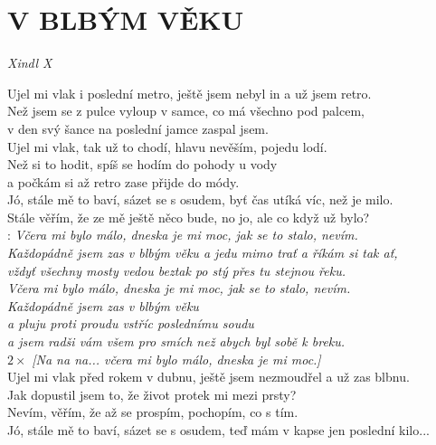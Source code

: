 \section*{\Huge V BLBÝM VĚKU}
\emph{Xindl X}\\

\begin{Large}

Ujel mi vlak i poslední metro, ještě jsem nebyl in a už jsem retro.\\
Než jsem se z pulce vyloup v samce, co má všechno pod palcem,\\
v den svý šance na poslední jamce zaspal jsem.\\

Ujel mi vlak, tak už to chodí, hlavu nevěším, pojedu lodí.\\
Než si to hodit, spíš se hodím do pohody u vody\\
a počkám si až retro zase přijde do módy.\\

Jó, stále mě to baví, sázet se s osudem, byť čas utíká víc, než je milo.\\
Stále věřím, že ze mě ještě něco bude, no jo, ale co když už bylo?\\

\textregistered: \emph{Včera mi bylo málo, dneska je mi moc,
jak se to stalo, nevím.\\
Každopádně jsem zas v blbým věku a jedu mimo trať a říkám si tak ať,\\
vždyť všechny mosty vedou beztak po stý přes tu stejnou řeku.}\\

\emph{Včera mi bylo málo, dneska je mi moc, jak se to stalo, nevím.\\
Každopádně jsem zas v blbým věku\\
a pluju proti proudu vstříc poslednímu soudu\\
a jsem radši vám všem pro smích než abych byl sobě k breku.}\\

$2\times$ \emph{[Na na na... včera mi bylo málo, dneska je mi moc.]}\\

Ujel mi vlak před rokem v dubnu, ještě jsem nezmoudřel a už zas blbnu.\\
Jak dopustil jsem to, že život protek mi mezi prsty?\\
Nevím, věřím, že až se prospím, pochopím, co s tím.\\
Jó, stále mě to baví, sázet se s osudem, teď mám v kapse jen poslední kilo...\\

\textregistered \textregistered

\end{Large}

\newpage
